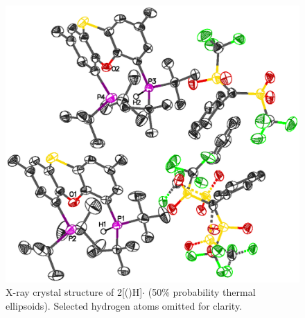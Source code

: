 \begin{figure}[hp!]
\begin{center}
\includegraphics{../Crystalstructures/mrmnb.eps}
\caption[X-ray crystal structure of {[}(\tButhixantphos)H{]}]{X-ray crystal structure of 2{[}(\tButhixantphos)H{]}$\cdot{}$  (50\% probability thermal ellipsoids).  Selected hydrogen atoms omitted for clarity.}
\label{Crystalprotonated}
\end{center}
\end{figure}

